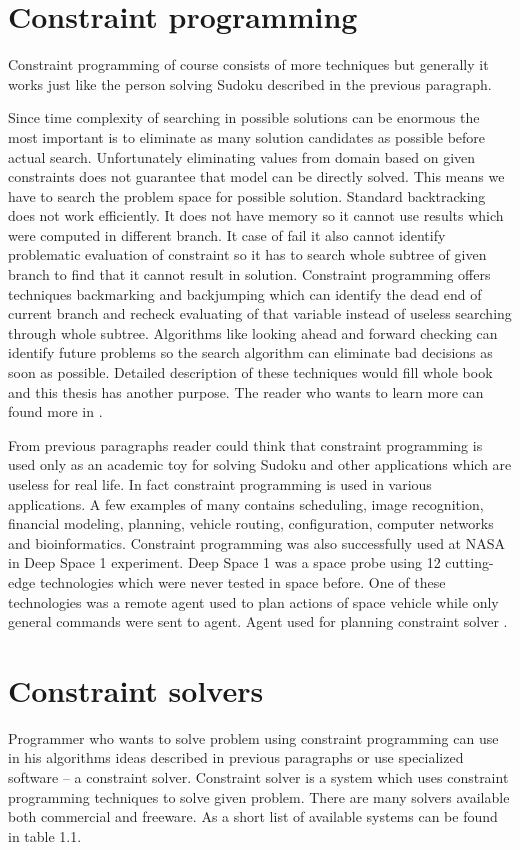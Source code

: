 \section{Constraint programming}
Constraint programming of course consists of more techniques but generally it works 
just like the person solving Sudoku described in the previous paragraph. 


Since time complexity 
of searching in possible solutions can be enormous the most important is to eliminate as 
many solution candidates as possible before actual search. Unfortunately eliminating values 
from domain based on given constraints does not guarantee that model can be directly solved. 
This means we have to search the problem space for possible solution. Standard backtracking 
does not work efficiently. It does not have memory so it cannot use results which 
were computed in different branch. It case of fail it also cannot identify problematic 
evaluation of constraint so it has to search whole subtree of given branch to find 
that it cannot result in solution. Constraint programming offers techniques backmarking 
and backjumping which can identify the dead end of current branch and recheck evaluating 
of that variable instead of useless searching through whole subtree. Algorithms 
like looking ahead and forward checking can identify future problems so the search 
algorithm can eliminate bad decisions as soon as possible. Detailed description 
of these techniques would fill whole book and this thesis has another purpose. 
The reader who wants to learn more can found more in \cite{bartak:ogcp}.

From previous paragraphs reader could think that constraint programming is used 
only as an academic toy for solving Sudoku and other applications which are useless 
for real life. In fact constraint programming is used in various applications. 
A few examples of many contains scheduling, image recognition, financial modeling, 
planning, vehicle routing, configuration, computer networks and bioinformatics. 
Constraint programming was also successfully used at NASA in Deep Space 1 experiment. 
Deep Space 1 was a space probe using 12 cutting-edge technologies which were never 
tested in space before. One of these technologies was a remote agent used to plan 
actions of space vehicle while only general commands were sent to agent. Agent 
used for planning constraint solver \cite{nasa:ds1-ara}.

\section{Constraint solvers}
Programmer who wants to solve problem using constraint programming can use in his 
algorithms ideas described in previous paragraphs or use specialized software -- a 
constraint solver. Constraint solver is a system which uses constraint programming 
techniques to solve given problem. There are many solvers available both commercial 
and freeware. As a short list of available systems can be found in table 1.1.

